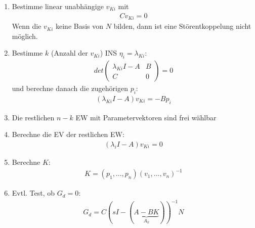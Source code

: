 \documentclass[a4paper,twocolumn,10pt]{article}
\begin{document}
\begin{enumerate}
\item Bestimme linear unabhängige $v_{Ki}$ mit
\begin{align*}
Cv_{Ki}=0
\end{align*}
Wenn die $v_{Ki}$ keine Basis von $N$ bilden, dann ist eine Störentkoppelung nicht möglich.
\item Bestimme $k$ (Anzahl der $v_{Ki}$) INS $\eta_i=\lambda_{Ki}$:
\begin{align*}
det\begin{pmatrix}\lambda_{Ki}I-A & B \\ C & 0\end{pmatrix}=0
\end{align*}
und berechne danach die zugehörigen $p_i$:
\begin{align*}
(\lambda_{Ki}I-A)v_{Ki}=-Bp_i
\end{align*}
\item Die restlichen $n-k$ EW mit Parametervektoren sind frei wählbar
\item Berechne die EV der restlichen EW:
\begin{align*}
(\lambda_iI-A)v_{Ki}=0
\end{align*}
\item Berechne $K$:
\begin{align*}
K=(p_1,...,p_n)(v_1,...,v_n)^{-1}
\end{align*}
\item Evtl. Test, ob $G_d=0$:
\begin{align*}
G_d=C(sI-(\underbrace{A-BK}_{A_k}))^{-1}N
\end{align*}
\end{enumerate}
\end{document}
